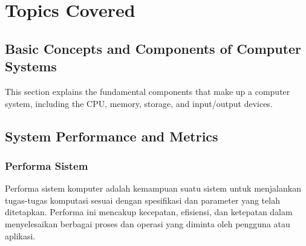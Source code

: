 \documentclass[12pt]{article}
\begin{document}
\section{Topics Covered}

\subsection{Basic Concepts and Components of Computer Systems}
This section explains the fundamental components that make up a computer system, including the CPU, memory, storage, and input/output devices.

\subsection{System Performance and Metrics}
\subsubsection{Performa Sistem}
Performa sistem komputer adalah kemampuan suatu sistem untuk menjalankan tugas-tugas komputasi sesuai dengan spesifikasi dan parameter yang telah ditetapkan. Performa ini mencakup kecepatan, efisiensi, dan ketepatan dalam menyelesaikan berbagai proses dan operasi yang diminta oleh pengguna atau aplikasi.
\end{document}
